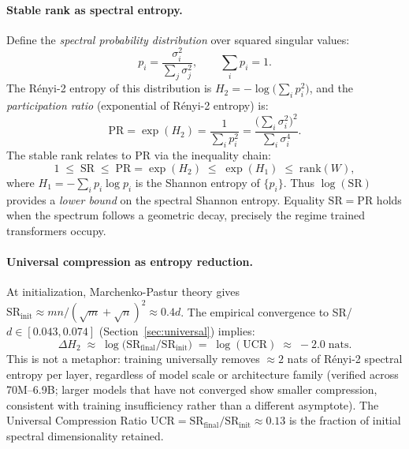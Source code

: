 \paragraph{Stable rank as spectral entropy.}
Define the \emph{spectral probability distribution} over squared singular values:
\begin{equation}
    p_i = \frac{\sigma_i^2}{\sum_j \sigma_j^2}, \qquad \sum_i p_i = 1.
    \label{eq:spectral_prob}
\end{equation}
The R\'{e}nyi-2 entropy of this distribution is $H_2 = -\log\!\bigl(\sum_i p_i^2\bigr)$, and the \emph{participation ratio} (exponential of R\'{e}nyi-2 entropy) is:
\begin{equation}
    \mathrm{PR} = \exp(H_2) = \frac{1}{\sum_i p_i^2} = \frac{\bigl(\sum_i \sigma_i^2\bigr)^2}{\sum_i \sigma_i^4}.
    \label{eq:participation_ratio}
\end{equation}
The stable rank relates to PR via the inequality chain:
\begin{equation}
    1 \;\leq\; \mathrm{SR} \;\leq\; \mathrm{PR} = \exp(H_2) \;\leq\; \exp(H_1) \;\leq\; \mathrm{rank}(W),
    \label{eq:entropy_chain}
\end{equation}
where $H_1 = -\sum_i p_i \log p_i$ is the Shannon entropy of $\{p_i\}$. Thus $\log(\mathrm{SR})$ provides a \emph{lower bound} on the spectral Shannon entropy. Equality $\mathrm{SR} = \mathrm{PR}$ holds when the spectrum follows a geometric decay, precisely the regime trained transformers occupy.

\paragraph{Universal compression as entropy reduction.}
At initialization, Marchenko-Pastur theory gives $\mathrm{SR}_{\mathrm{init}} \approx mn/(\sqrt{m}+\sqrt{n})^2 \approx 0.4d$. The empirical convergence to SR/$d \in [0.043, 0.074]$ (Section~\ref{sec:universal}) implies:
\begin{equation}
    \Delta H_2 \;\approx\; \log\!\bigl(\mathrm{SR}_{\mathrm{final}}/\mathrm{SR}_{\mathrm{init}}\bigr) \;=\; \log(\mathrm{UCR}) \;\approx\; -2.0 \;\text{nats}.
    \label{eq:delta_entropy}
\end{equation}
This is not a metaphor: training universally removes ${\approx}2$ nats of R\'{e}nyi-2 spectral entropy per layer, regardless of model scale or architecture family (verified across 70M--6.9B; larger models that have not converged show smaller compression, consistent with training insufficiency rather than a different asymptote). The Universal Compression Ratio $\mathrm{UCR} = \mathrm{SR}_{\mathrm{final}}/\mathrm{SR}_{\mathrm{init}} \approx 0.13$ is the fraction of initial spectral dimensionality retained.


